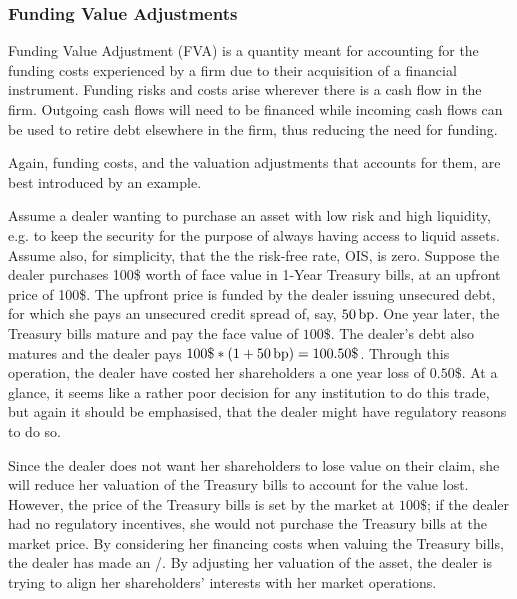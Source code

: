 \documentclass[main.tex]{subfiles}
\begin{document}
    \subsubsection{Funding Value Adjustments}
        Funding Value Adjustment (FVA) is a quantity meant for accounting for the funding costs 
        experienced by a firm due to their acquisition of a financial instrument.
        Funding risks and costs arise wherever there is a cash flow in the firm. 
        Outgoing cash flows will need to be financed while incoming cash flows
        can be used to retire debt elsewhere in the firm, thus reducing the need for funding.

        Again, funding costs, and the valuation adjustments that accounts for them,
        are best introduced by an example.

        Assume a dealer wanting to purchase an asset with low risk and high liquidity, 
        e.g. to keep the security for the purpose of always having access to liquid assets.
        Assume also, for simplicity, that the the risk-free rate, OIS, is zero.
        Suppose the dealer purchases 100\$ worth of face value in 1-Year Treasury bills,
        at an upfront price of 100\$. 
        The upfront price is funded by the dealer issuing unsecured debt, 
        for which she pays an unsecured credit spread of, say, $50\,\text{bp}$.
        One year later, the Treasury bills mature and pay the face value of $100\$$.
        The dealer's debt also matures and the dealer pays $100\$ * (1 + 50\basispoint) = 100.50\$$.
        Through this operation, the dealer have costed her shareholders a one year loss of $0.50\$$.
        At a glance, it seems like a rather poor decision for any institution to do this trade,
        but again it should be emphasised, that the dealer might have regulatory reasons to do so.

        Since the dealer does not want her shareholders to lose value on their claim,
        she will reduce her valuation of the Treasury bills to account for the value lost.
        However, the price of the Treasury bills is set by the market at $100\$$;
        if the dealer had no regulatory incentives, 
        she would not purchase the Treasury bills at the market price. 
        By considering her financing costs when valuing the Treasury bills, 
        the dealer has made an \FVA/.
        By adjusting her valuation of the asset, 
        the dealer is trying to align her shareholders' interests with her market operations.
        
\end{document}
